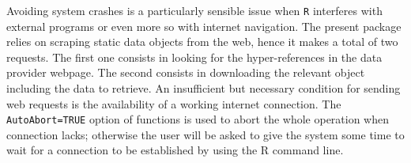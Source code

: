 \documentclass[openany, 11pt, oneside]{book}
\begin{document}
Avoiding system crashes is a particularly sensible issue when \texttt{R} interferes with external programs or even more so with internet navigation. The present package relies on scraping static data objects from the web, hence it makes a total of two requests. The first one consists in looking for the hyper-references in the data provider webpage. The second consists in downloading the relevant object including the data to retrieve. An insufficient but necessary condition for sending web requests is the availability of a working internet connection. The \texttt{AutoAbort=TRUE} option of \texttt{} functions is used to abort the whole operation when connection lacks; otherwise the user will be asked to give the system some time to wait for a connection to be established by using the R command line. 
\end{document}
